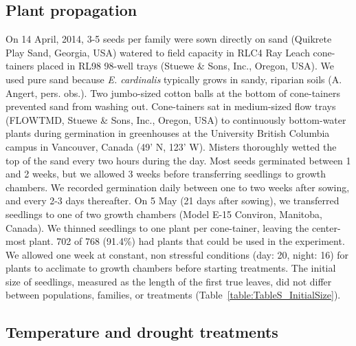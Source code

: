 \documentclass[11pt, oneside]{article}
\begin{document}
\subsection*{Plant propagation}

On 14 April, 2014, 3-5 seeds per family were sown directly on sand (Quikrete Play Sand, Georgia, USA) watered to field capacity in RLC4 Ray Leach cone-tainers placed in RL98 98-well trays (Stuewe \& Sons, Inc., Oregon, USA). We used pure sand because \textit{E. cardinalis} typically grows in sandy, riparian soils (A. Angert, pers. obs.). Two jumbo-sized cotton balls at the bottom of cone-tainers prevented sand from washing out. Cone-tainers sat in medium-sized flow trays (FLOWTMD, Stuewe \& Sons, Inc., Oregon, USA) to continuously bottom-water plants during germination in greenhouses at the University British Columbia campus in Vancouver, Canada (49' N, 123' W). Misters thoroughly wetted the top of the sand every two hours during the day. Most seeds germinated between 1 and 2 weeks, but we allowed 3 weeks before transferring seedlings to growth chambers. We recorded germination daily between one to two weeks after sowing, and every 2-3 days thereafter. On 5 May (21 days after sowing), we transferred seedlings to one of two growth chambers (Model E-15 Conviron, Manitoba, Canada). We thinned seedlings to one plant per cone-tainer, leaving the center-most plant. 702 of 768 (91.4\%) had plants that could be used in the experiment. We allowed one week at constant, non stressful conditions (day: 20\celsius, night: 16\celsius) for plants to acclimate to growth chambers before starting treatments. The initial size of seedlings, measured as the length of the first true leaves, did not differ between populations, families, or treatments (Table~\ref{table:TableS_InitialSize}).
    
\subsection*{Temperature and drought treatments}
\end{document}
